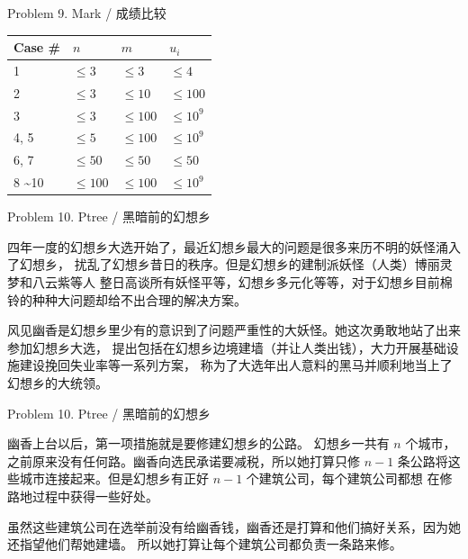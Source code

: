 \documentclass[UTF8]{beamer}
\begin{document}
\begin{frame}{Problem 9. Mark / 成绩比较}

\begin{tabularx}{\textwidth}{X|X|X|X} \hline
Case \# & $n$ & $m$ & $u_i$ \\ \hline \hline
1    & $\leq 3$   & $\leq 3$   & $\leq 4$    \\ \hline
2    & $\leq 3$   & $\leq 10$  & $\leq 100$  \\ \hline
3    & $\leq 3$   & $\leq 100$ & $\leq 10^9$ \\ \hline
4, 5 & $\leq 5$   & $\leq 100$ & $\leq 10^9$ \\ \hline
6, 7 & $\leq 50$  & $\leq 50$  & $\leq 50$   \\ \hline
8 \textasciitilde 10 & $\leq 100$ & $\leq 100$ & $\leq 10^9$ \\ \hline
\end{tabularx}

\end{frame}


\begin{frame}{Problem 10. Ptree / 黑暗前的幻想乡}

四年一度的幻想乡大选开始了，最近幻想乡最大的问题是很多来历不明的妖怪涌入了幻想乡，
扰乱了幻想乡昔日的秩序。但是幻想乡的建制派妖怪（人类）博丽灵梦和八云紫等人
整日高谈所有妖怪平等，幻想乡多元化等等，对于幻想乡目前棉铃的种种大问题却给不出合理的解决方案。

风见幽香是幻想乡里少有的意识到了问题严重性的大妖怪。她这次勇敢地站了出来参加幻想乡大选，
提出包括在幻想乡边境建墙（并让人类出钱），大力开展基础设施建设挽回失业率等一系列方案，
称为了大选年出人意料的黑马并顺利地当上了幻想乡的大统领。

\end{frame}

\begin{frame}{Problem 10. Ptree / 黑暗前的幻想乡}

幽香上台以后，第一项措施就是要修建幻想乡的公路。
幻想乡一共有 $n$ 个城市，之前原来没有任何路。幽香向选民承诺要减税，所以她打算只修
$n - 1$ 条公路将这些城市连接起来。但是幻想乡有正好 $n - 1$ 个建筑公司，每个建筑公司都想
在修路地过程中获得一些好处。

虽然这些建筑公司在选举前没有给幽香钱，幽香还是打算和他们搞好关系，因为她还指望他们帮她建墙。
所以她打算让每个建筑公司都负责一条路来修。

\end{frame}
\end{document}
